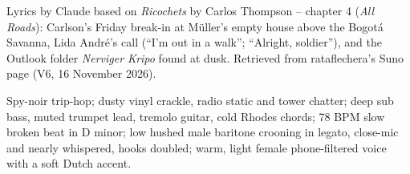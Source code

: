 
\begin{notes}
Lyrics by Claude based on \emph{Ricochets} by Carlos Thompson -- chapter 4 (\emph{All Roads}): Carlson's Friday break-in at Müller's empty house above the Bogotá Savanna, Lida André's call (``I'm out in a walk''; ``Alright, soldier''), and the Outlook folder \emph{Nerviger Kripo} found at dusk. Retrieved from rataflechera's Suno page (V6, 16 November 2026).
\end{notes}
\begin{style}
Spy-noir trip-hop; dusty vinyl crackle, radio static and tower chatter; deep sub bass, muted trumpet lead, tremolo guitar, cold Rhodes chords; 78 BPM slow broken beat in D minor; low hushed male baritone crooning in legato, close-mic and nearly whispered, hooks doubled; warm, light female phone-filtered voice with a soft Dutch accent.
\end{style}
